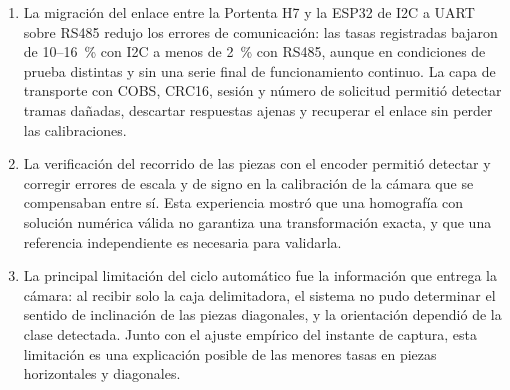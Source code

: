 \begin{enumerate}
	\item La migración del enlace entre la Portenta H7 y la ESP32 de I2C a UART sobre RS485 redujo los errores de comunicación: las tasas registradas bajaron de 10--16~\% con I2C a menos de 2~\% con RS485, aunque en condiciones de prueba distintas y sin una serie final de funcionamiento continuo. La capa de transporte con COBS, CRC16, sesión y número de solicitud permitió detectar tramas dañadas, descartar respuestas ajenas y recuperar el enlace sin perder las calibraciones.

	\item La verificación del recorrido de las piezas con el encoder permitió detectar y corregir errores de escala y de signo en la calibración de la cámara que se compensaban entre sí. Esta experiencia mostró que una homografía con solución numérica válida no garantiza una transformación exacta, y que una referencia independiente es necesaria para validarla.

	\item La principal limitación del ciclo automático fue la información que entrega la cámara: al recibir solo la caja delimitadora, el sistema no pudo determinar el sentido de inclinación de las piezas diagonales, y la orientación dependió de la clase detectada. Junto con el ajuste empírico del instante de captura, esta limitación es una explicación posible de las menores tasas en piezas horizontales y diagonales.
\end{enumerate}
